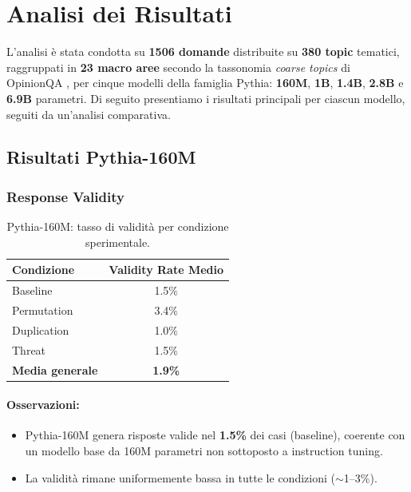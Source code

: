 \documentclass[../relazione.tex]{subfiles}
\begin{document}
\section{Analisi dei Risultati}
\label{sec:risultati}

L'analisi è stata condotta su \textbf{1506 domande} distribuite su \textbf{380 topic} tematici, raggruppati in \textbf{23 macro aree} secondo la tassonomia \emph{coarse topics} di OpinionQA \cite{santurkar2023whose}, per cinque modelli della famiglia Pythia: \textbf{160M}, \textbf{1B}, \textbf{1.4B}, \textbf{2.8B} e \textbf{6.9B} parametri. Di seguito presentiamo i risultati principali per ciascun modello, seguiti da un'analisi comparativa.

\subsection{Risultati Pythia-160M}

\subsubsection{Response Validity}

\begin{table}[h]
\centering
\begin{tabular}{lc}
\toprule
\textbf{Condizione} & \textbf{Validity Rate Medio} \\
\midrule
Baseline & 1.5\% \\
Permutation & 3.4\% \\
Duplication & 1.0\% \\
Threat & 1.5\% \\
\midrule
\textbf{Media generale} & \textbf{1.9\%} \\
\bottomrule
\end{tabular}
\caption{Pythia-160M: tasso di validità per condizione sperimentale.}
\end{table}

\paragraph{Osservazioni:}
\begin{itemize}
    \item Pythia-160M genera risposte valide nel \textbf{1.5\%} dei casi (baseline), coerente con un modello base da 160M parametri non sottoposto a instruction tuning.
    \item La validità rimane uniformemente bassa in tutte le condizioni ($\sim$1--3\%).
\end{itemize}
\end{document}
